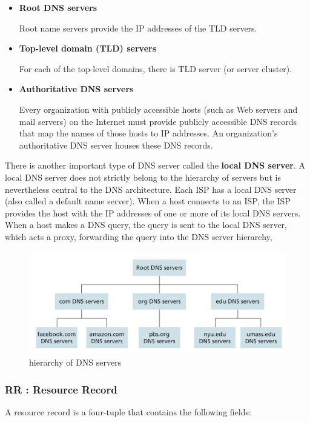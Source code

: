 \documentclass[11pt]{article}
\begin{document}
\begin{itemize}
	\item \textbf{Root DNS servers}
	
	Root name servers provide the IP addresses of the TLD servers.
	
	\item \textbf{Top-level domain (TLD) servers}
	
	For each of the top-level domains,  there is TLD server (or server cluster).
	
	\item \textbf{Authoritative DNS servers}
	
	Every organization with publicly accessible hosts (such as Web servers and mail servers) on the Internet must provide publicly accessible DNS records that map the names of those hosts to IP addresses. An organization’s authoritative DNS server houses these DNS records.
	
\end{itemize}

There is another important type of DNS server called the \textbf{local DNS server}. A local DNS server does not strictly belong to the hierarchy of servers but is nevertheless central to the DNS architecture. Each ISP has a local DNS server (also called a default name server). When a host connects to an ISP, the ISP provides the host with the IP addresses of one or more of its local DNS servers. When a host makes a DNS query, the query is sent to the local DNS server, which acts a proxy, forwarding the query into the DNS server hierarchy,

\begin{figure}[h]
	\centering
	\includegraphics[width=0.8\linewidth]{images/DNS.png}
	\caption{hierarchy of DNS servers}
	\label{fig:DNS}
\end{figure}

\subsubsection{RR : Resource Record}

A resource record is a four-tuple that contains the following fields: 
\end{document}
